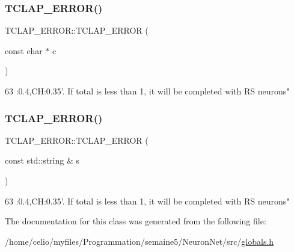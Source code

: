 \subsubsection{\texorpdfstring{T\+C\+L\+A\+P\+\_\+\+E\+R\+R\+O\+R()}{TCLAP\_ERROR()}\hspace{0.1cm}{\footnotesize\ttfamily [1/2]}}
{\footnotesize\ttfamily T\+C\+L\+A\+P\+\_\+\+E\+R\+R\+O\+R\+::\+T\+C\+L\+A\+P\+\_\+\+E\+R\+R\+OR (\begin{DoxyParamCaption}\item[{const char $\ast$}]{c }\end{DoxyParamCaption})\hspace{0.3cm}{\ttfamily [inline]}}


\begin{DoxyCode}
63 :0.4,CH:0.35\textcolor{stringliteral}{'. If total is less than 1, it will be completed with RS neurons"}
\end{DoxyCode}
\mbox{\label{classTCLAP__ERROR_a8df7cf40b000475e793bb76517256db3}} 
\subsubsection{\texorpdfstring{T\+C\+L\+A\+P\+\_\+\+E\+R\+R\+O\+R()}{TCLAP\_ERROR()}\hspace{0.1cm}{\footnotesize\ttfamily [2/2]}}
{\footnotesize\ttfamily T\+C\+L\+A\+P\+\_\+\+E\+R\+R\+O\+R\+::\+T\+C\+L\+A\+P\+\_\+\+E\+R\+R\+OR (\begin{DoxyParamCaption}\item[{const std\+::string \&}]{s }\end{DoxyParamCaption})\hspace{0.3cm}{\ttfamily [inline]}}


\begin{DoxyCode}
63 :0.4,CH:0.35\textcolor{stringliteral}{'. If total is less than 1, it will be completed with RS neurons"}
\end{DoxyCode}


The documentation for this class was generated from the following file\+:\begin{DoxyCompactItemize}
\item 
/home/celio/myfiles/\+Programmation/semaine5/\+Neuron\+Net/src/\hyperlink{globals_8h}{globals.\+h}\end{DoxyCompactItemize}
